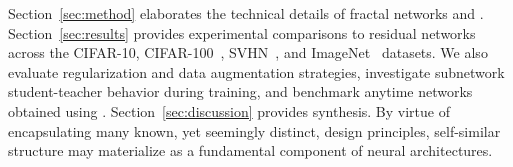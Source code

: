 Section~\ref{sec:method} elaborates the technical details of fractal networks
and {\droppath}.  Section~\ref{sec:results} provides experimental comparisons
to residual networks across the CIFAR-10, CIFAR-100~\citep{CIFAR}, SVHN~\citep{
SVHN}, and ImageNet~\citep{deng2009imagenet} datasets.  We also evaluate
regularization and data augmentation strategies, investigate subnetwork
student-teacher behavior during training, and benchmark anytime networks
obtained using {\droppath}.  Section~\ref{sec:discussion} provides synthesis.
By virtue of encapsulating many known, yet seemingly distinct, design
principles, self-similar structure may materialize as a fundamental component
of neural architectures.
